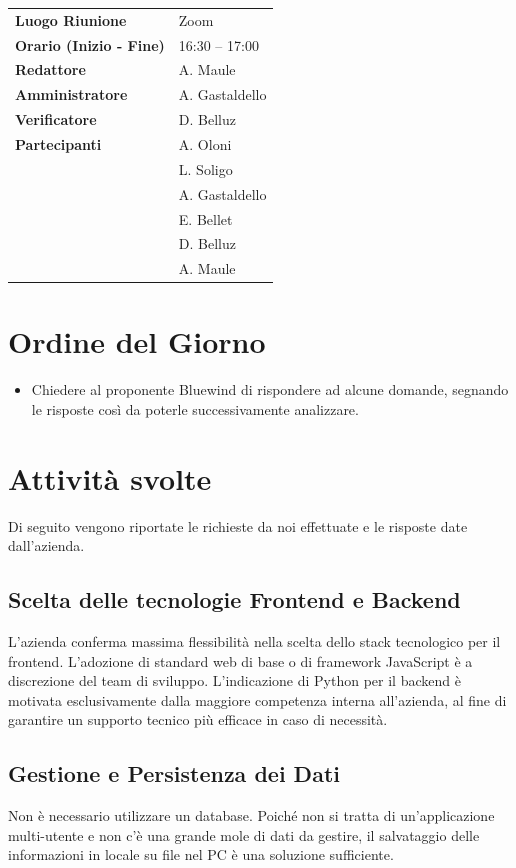 \documentclass[a4paper,12pt]{article}
\begin{document}
\begin{tabular}{>{\bfseries}p{5cm} | p{10cm}}
Luogo Riunione & Zoom \\[6pt]

Orario (Inizio - Fine) & 16:30 -- 17:00 \\[6pt]

Redattore &
  A. Maule\\[6pt]

Amministratore & 
A. Gastaldello\\[6pt]

Verificatore &
D. Belluz\\[6pt]

Partecipanti &
  A. Oloni\\ &
  L. Soligo\\&
  A. Gastaldello\\&
  E. Bellet\\&
  D. Belluz\\&
  A. Maule\\[6pt]
  
\end{tabular}

\section{Ordine del Giorno}
    \begin{itemize}
    \item  Chiedere al proponente Bluewind di rispondere ad alcune 
domande, segnando le risposte così da poterle successivamente analizzare.
    \end{itemize}

\section{Attività svolte}
Di seguito vengono riportate le richieste da noi effettuate e le risposte date dall'azienda.
\subsection{Scelta delle tecnologie Frontend e Backend}
L'azienda conferma massima flessibilità nella scelta dello stack tecnologico per il frontend. L'adozione di standard web di base o di framework JavaScript è a discrezione del team di sviluppo. L'indicazione di Python per il backend è motivata esclusivamente dalla maggiore competenza interna all'azienda, al fine di garantire un supporto tecnico più efficace in caso di necessità.
\subsection{Gestione e Persistenza dei Dati}
Non è necessario utilizzare un database. Poiché non si tratta di un'applicazione multi-utente e non c'è una grande mole di dati da gestire, il salvataggio delle informazioni in locale su file nel PC è una soluzione sufficiente.
\end{document}

